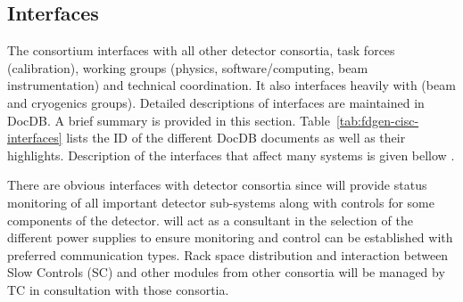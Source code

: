 \begin{comment}
\\ \toprowrule
22
&
Problems in interfacing  hardware devices (e.g. power supplies) with slow controls
&
Slow controls team could have problems to monitor/control some hardware devices which do not have the necessary services/options
&
M
The choice of HV/LV power supplies and other hardware devices that need control/monitoring should be done in consultation with slow control experts to ensure the hardware choice allows for robust control/monitoring at the precision needed. 
\end{tabular}
\end{table}
\end{comment}

\subsection{Interfaces}
\label{sec:interfaces}

The  consortium interfaces with all other detector consortia, task forces (calibration),
working groups (physics, software/computing, beam instrumentation) and technical coordination. It also interfaces heavily with  (beam and cryogenics groups).  
Detailed descriptions of  interfaces are maintained in  DocDB. A brief summary is provided in this section. Table~\ref{tab:fdgen-cisc-interfaces} lists the ID of the different DocDB documents as well as their highlights. Description of the interfaces that affect many systems is given bellow . 

There are obvious interfaces with detector consortia since  will provide status monitoring of all important detector sub-systems along with controls for some components of the detector.
 will act as a consultant in the selection of the different power supplies to ensure monitoring and control can be established with preferred communication types. 
Rack space distribution and interaction between Slow Controls (SC) and other modules from other consortia will be managed by TC in consultation with those consortia. 

